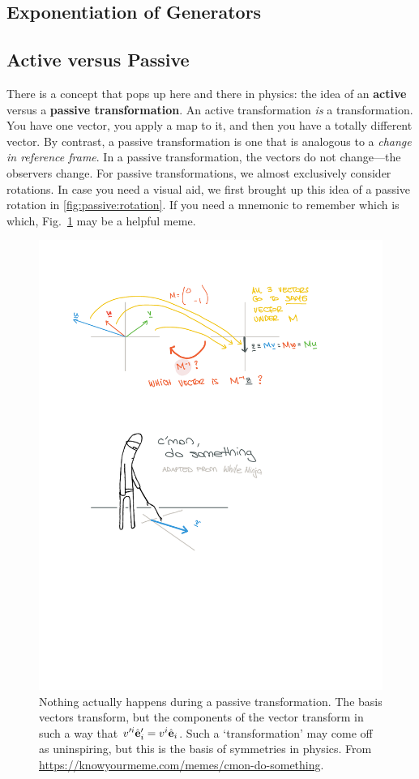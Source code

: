 \documentclass[12pt]{article}
\begin{document}
\subsection{Exponentiation of Generators}



\subsection{Active versus Passive}

There is a concept that pops up here and there in physics: the idea of an \textbf{active} versus a \textbf{passive transformation}. An active transformation \emph{is} a transformation. You have one vector, you apply a map to it, and then you have a totally different vector. By contrast, a {passive} transformation is one that is analogous to a \emph{change in reference frame}. In a passive transformation, the vectors do not change---the observers change. For passive transformations, we almost exclusively consider rotations. In case you need a visual aid, we first brought up this idea of a passive rotation in \eqref{fig:passive:rotation}. If you need a mnemonic to remember which is which, Fig.~\ref{fig:do:something} may be a helpful meme.
\begin{figure}[tb]
    \centering
    \includegraphics[width=.5\textwidth]{figures/passivetransform_dosomething.pdf}
    \caption{
        Nothing actually happens during a passive transformation. The basis vectors transform, but the components of the vector transform in such a way that $v'^i\hat{\mathbf{e}}'_i = v^i\hat{\mathbf{e}}_i$. Such a `transformation' may come off as uninspiring, but this is the basis of symmetries in physics. 
        From \url{https://knowyourmeme.com/memes/cmon-do-something}.
    }
    \label{fig:do:something}
\end{figure}
\end{document}
